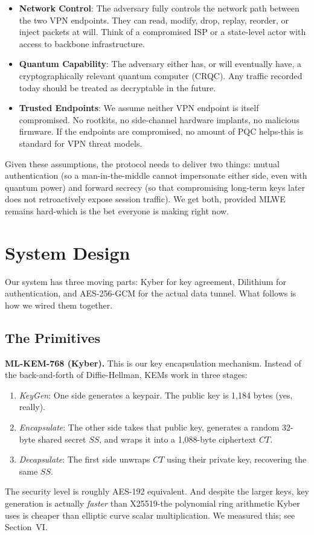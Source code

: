 \documentclass[10pt, conference, letterpaper]{IEEEtran}
\begin{document}
\begin{itemize}
    \item \textbf{Network Control}: The adversary fully controls the network path between the two VPN endpoints. They can read, modify, drop, replay, reorder, or inject packets at will. Think of a compromised ISP or a state-level actor with access to backbone infrastructure.
    \item \textbf{Quantum Capability}: The adversary either has, or will eventually have, a cryptographically relevant quantum computer (CRQC). Any traffic recorded today should be treated as decryptable in the future.
    \item \textbf{Trusted Endpoints}: We assume neither VPN endpoint is itself compromised. No rootkits, no side-channel hardware implants, no malicious firmware. If the endpoints are compromised, no amount of PQC helps-this is standard for VPN threat models.
\end{itemize}

Given these assumptions, the protocol needs to deliver two things: mutual authentication (so a man-in-the-middle cannot impersonate either side, even with quantum power) and forward secrecy (so that compromising long-term keys later does not retroactively expose session traffic). We get both, provided MLWE remains hard-which is the bet everyone is making right now.

\section{System Design}

Our system has three moving parts: Kyber for key agreement, Dilithium for authentication, and AES-256-GCM for the actual data tunnel. What follows is how we wired them together.

\subsection{The Primitives}

\textbf{ML-KEM-768 (Kyber).} This is our key encapsulation mechanism. Instead of the back-and-forth of Diffie-Hellman, KEMs work in three stages:
\begin{enumerate}
    \item \textit{KeyGen}: One side generates a keypair. The public key is 1,184 bytes (yes, really).
    \item \textit{Encapsulate}: The other side takes that public key, generates a random 32-byte shared secret $SS$, and wraps it into a 1,088-byte ciphertext $CT$.
    \item \textit{Decapsulate}: The first side unwraps $CT$ using their private key, recovering the same $SS$.
\end{enumerate}
The security level is roughly AES-192 equivalent. And despite the larger keys, key generation is actually \textit{faster} than X25519-the polynomial ring arithmetic Kyber uses is cheaper than elliptic curve scalar multiplication. We measured this; see Section~VI.
\end{document}
